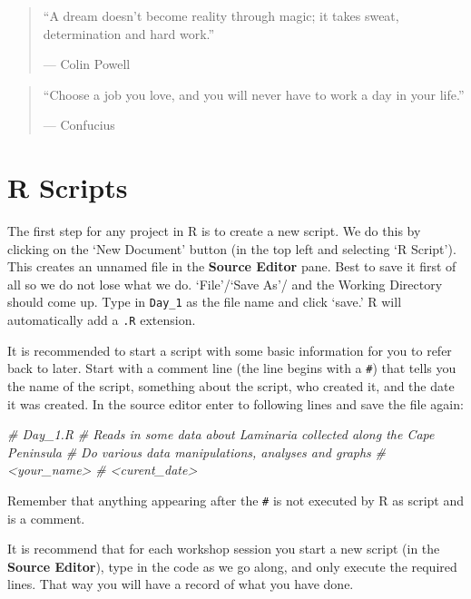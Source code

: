 \documentclass[]{book}
\newenvironment{Shaded}{\begin{snugshade}}{\end{snugshade}}
\newcommand{\CommentTok}[1]{\textcolor[rgb]{0.56,0.35,0.01}{\textit{#1}}}
\theoremstyle{definition}
\theoremstyle{definition}
\theoremstyle{definition}
\theoremstyle{remark}
\begin{document}
\begin{quote}
``A dream doesn't become reality through magic; it takes sweat,
determination and hard work.''

--- Colin Powell
\end{quote}

\begin{quote}
``Choose a job you love, and you will never have to work a day in your
life.''

--- Confucius
\end{quote}

\section{R Scripts}\label{r-scripts}

The first step for any project in R is to create a new script. We do
this by clicking on the `New Document' button (in the top left and
selecting `R Script'). This creates an unnamed file in the
\textbf{Source Editor} pane. Best to save it first of all so we do not
lose what we do. `File'/`Save As'/ and the Working Directory should come
up. Type in \texttt{Day\_1} as the file name and click `save.' R will
automatically add a \texttt{.R} extension.

It is recommended to start a script with some basic information for you
to refer back to later. Start with a comment line (the line begins with
a \texttt{\#}) that tells you the name of the script, something about
the script, who created it, and the date it was created. In the source
editor enter to following lines and save the file again:

\begin{Shaded}
\begin{Highlighting}[]
\CommentTok{# Day_1.R}
\CommentTok{# Reads in some data about Laminaria collected along the Cape Peninsula}
\CommentTok{# Do various data manipulations, analyses and graphs}
\CommentTok{# <your_name>}
\CommentTok{# <curent_date>}
\end{Highlighting}
\end{Shaded}

Remember that anything appearing after the \texttt{\#} is not executed
by R as script and is a comment.

It is recommend that for each workshop session you start a new script
(in the \textbf{Source Editor}), type in the code as we go along, and
only execute the required lines. That way you will have a record of what
you have done.
\end{document}
